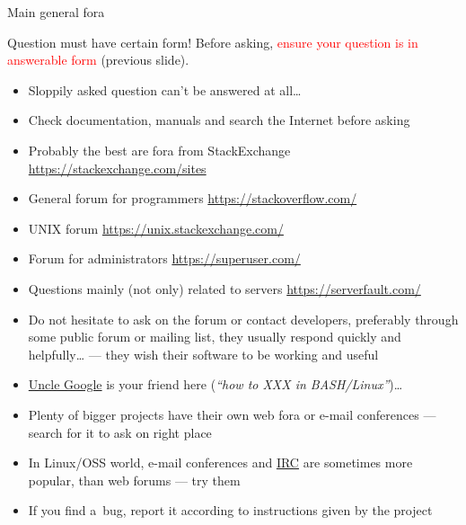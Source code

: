 \documentclass[compress, ucs, xelatex, 11pt, xcolor=svgnames,
  hyperref={
    bookmarks=true,
    unicode=true,
    colorlinks=true,
    pdftitle={Linux, command line and MetaCentrum},
    plainpages=false,
    pdfauthor={Vojtech Zeisek},
    pdfsubject={Course about use of Linux command line, writing shell scripts and using MetaCentrum of CESNET},
    pdfcreator={XeLaTeX},
    pdfkeywords={Linux, GNU, BASH, shell, command line, MetaCentrum},
    linkcolor=DarkRed,
    anchorcolor=DarkBlue,
    citecolor=Indigo,
    filecolor=NavyBlue,
    menucolor=DarkMagenta,
    urlcolor=DarkBlue,
    pdftex},
  url={hyphens, lowtilde} %
  ]{beamer}
\renewcommand{\alert}[1]{\textcolor{red}{#1}}
\begin{document}
\begin{frame}[allowframebreaks]{Main general fora}
  \begin{block}{Question must have certain form!}
     Before asking, \alert{ensure your question is in answerable form} (previous slide).
    \begin{itemize}
      \item Sloppily asked question can't be answered at all\ldots
      \item Check documentation, manuals and search the Internet before asking
    \end{itemize}
  \end{block}
  \begin{itemize}
    \item Probably the best are fora from StackExchange \url{https://stackexchange.com/sites}
    \item General forum for programmers \url{https://stackoverflow.com/}
    \item UNIX forum \url{https://unix.stackexchange.com/}
    \item Forum for administrators \url{https://superuser.com/}
    \item Questions mainly (not only) related to servers \url{https://serverfault.com/}
    \item Do not hesitate to ask on the forum or contact developers, preferably through some public forum or mailing list, they usually respond quickly and helpfully\ldots{ }--- they wish their software to be working and useful
    \item \href{https://www.startpage.com/}{Uncle Google} is your friend here (\textit{``how to XXX in BASH/Linux''})\ldots
    \item Plenty of bigger projects have their own web fora or e-mail conferences --- search for it to ask on right place
    \item In Linux/OSS world, e-mail conferences and \href{https://en.wikipedia.org/wiki/Internet_Relay_Chat}{IRC} are sometimes more popular, than web forums --- try them
    \item If you find a~bug, report it according to instructions given by the project
  \end{itemize}
\end{frame}
\end{document}
